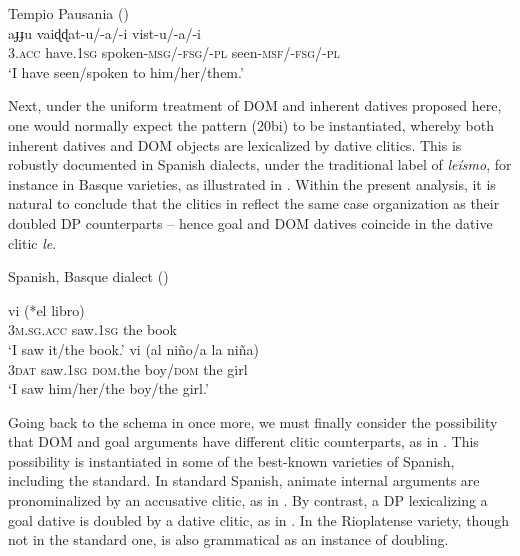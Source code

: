 \documentclass[output=paper]{langscibook}
\begin{document}
\ea\label{ex:manzini:22}
Tempio Pausania (\citealt{ManziniSavoia2005}) \\
    {aɟɟu}     {vaiɖɖat-u/-a/-i}    {vist-u/-a/-i}\\
\textsc{3.acc}  have.\textsc{1sg}   spoken-\textsc{msg/-fsg/-pl} seen-\textsc{msf/-fsg/-pl}\\
\glt ‘I have seen/spoken to him/her/them.’
\z


Next, under the uniform treatment of DOM and inherent datives proposed here, one would normally expect the pattern (20bi) to be instantiated, whereby both inherent datives and DOM objects are lexicalized by dative clitics. This is robustly documented in Spanish dialects, under the traditional label of \textit{leísmo}, for instance in Basque varieties, as illustrated in .  Within the present analysis, it is natural to conclude that the clitics in  reflect the same case organization as their doubled DP counterparts – hence goal and DOM datives coincide in the dative clitic \textit{le}. 

\ea\label{ex:manzini:23}
Spanish, Basque dialect (\citealt{OrmazabalRomero2013})\\
\begin{xlist}
\ex {}     {vi}     (*el libro)\\
\textsc{3m.sg.acc}  saw.\textsc{1sg}  {\db}the book\\
\glt ‘I saw it/the book.’
\ex {}   {vi}     (al niño/a la niña)\\
\textsc{3dat}  saw.\textsc{1sg}  \textsc{dom}.the boy/\textsc{dom} the girl\\
\glt ‘I saw him/her/the boy/the girl.’
\end{xlist}
\z


Going back to the schema in  once more, we must finally consider the possibility that DOM and goal arguments have different clitic counterparts, as in . This possibility is instantiated in some of the best-known varieties of Spanish, including the standard. In standard Spanish, animate internal arguments are pronominalized by an accusative clitic, as in . By contrast, a DP lexicalizing a goal dative is doubled by a dative clitic, as in . In the Rioplatense variety, though not in the standard one,  is also grammatical as an instance of doubling.
\end{document}
